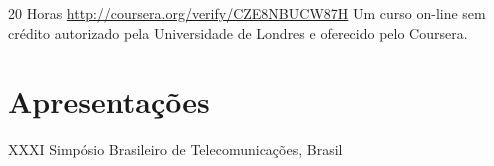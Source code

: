 \documentclass[11pt,a4paper,sans]{moderncv} %
\begin{document}
	      {20 Horas}
	      {\url{http://coursera.org/verify/CZE8NBUCW87H}}{}
	      {Um curso on-line sem crédito autorizado pela Universidade de Londres e oferecido pelo Coursera.}












\section{Apresentações}

	      {}{}{}
	      {XXXI Simpósio Brasileiro de Telecomunicações, Brasil}
\end{document}
